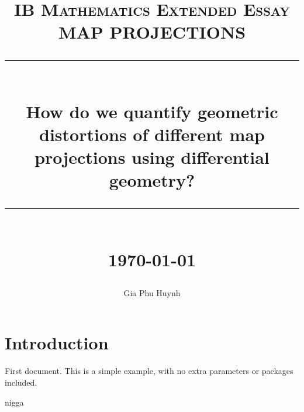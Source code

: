 \documentclass[12pt]{article}
\title{ 
    \normalsize \textsc{IB Mathematics Extended Essay} \\ [2.5cm]

	\LARGE MAP PROJECTIONS
	\rule{\linewidth}{0.5pt} \\
	\Large \textbf{How do we quantify geometric distortions of different map projections using differential geometry?}
	\rule{\linewidth}{1pt} \\ [1cm]
	\normalsize \today \vspace*{5\baselineskip}
}
\date{}
\author{Gia Phu Huynh}
\begin{document}
\maketitle

\pagebreak
\tableofcontents

\pagebreak
\section{Introduction}
First document. This is a simple example, with no 
extra parameters or packages included.
\begin{definition}
	nigga
\end{definition}
\end{document}
